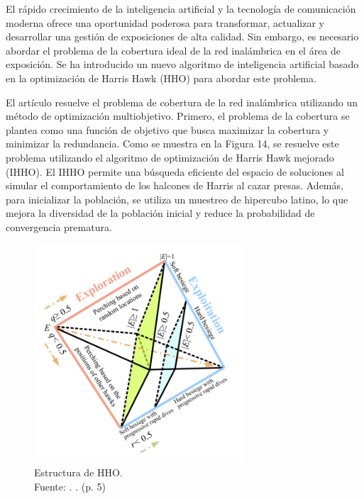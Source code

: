 El rápido crecimiento de la inteligencia artificial y la tecnología de comunicación moderna ofrece una oportunidad poderosa para transformar, actualizar y desarrollar una gestión de exposiciones de alta calidad. Sin embargo, es necesario abordar el problema de la cobertura ideal de la red inalámbrica en el área de exposición. Se ha introducido un nuevo algoritmo de inteligencia artificial basado en la optimización de Harris Hawk (HHO) para abordar este problema.

El artículo resuelve el problema de cobertura de la red inalámbrica utilizando un método de optimización multiobjetivo. Primero, el problema de la cobertura se plantea como una función de objetivo que busca maximizar la cobertura y minimizar la redundancia. Como se muestra en la Figura 14, se resuelve este problema utilizando el algoritmo de optimización de Harris Hawk mejorado (IHHO). El IHHO permite una búsqueda eficiente del espacio de soluciones al simular el comportamiento de los halcones de Harris al cazar presas. Además, para inicializar la población, se utiliza un muestreo de hipercubo latino, lo que mejora la diversidad de la población inicial y reduce la probabilidad de convergencia prematura.

\begin{figure}[!ht]
	\begin{center}
		\includegraphics[width=0.70\textwidth]{2/figures/dou2023.png}
		\caption[Estructura de HHO]{Estructura de HHO.\\
		Fuente: \cite{pr_dou2023researchwir}. . (p. 5)}
		\label{2:fig123}
	\end{center}
\end{figure}

